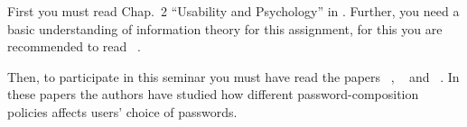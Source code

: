 First you must read Chap.~2 \enquote{Usability and Psychology} in 
\cite{Anderson2008sea}.
Further, you need a basic understanding of information theory 
\cite{Shannon1948amt} for this assignment, for this you are recommended to read 
~\cite{Ueltschi2013se}.

Then, to participate in this seminar you must have read the papers 
~\cite{Komanduri2011opa},
~\cite{kelley2012guess} and
~\cite{Komanduri2014can}.
In these papers the authors have studied how different password-composition 
policies affects users' choice of passwords.
